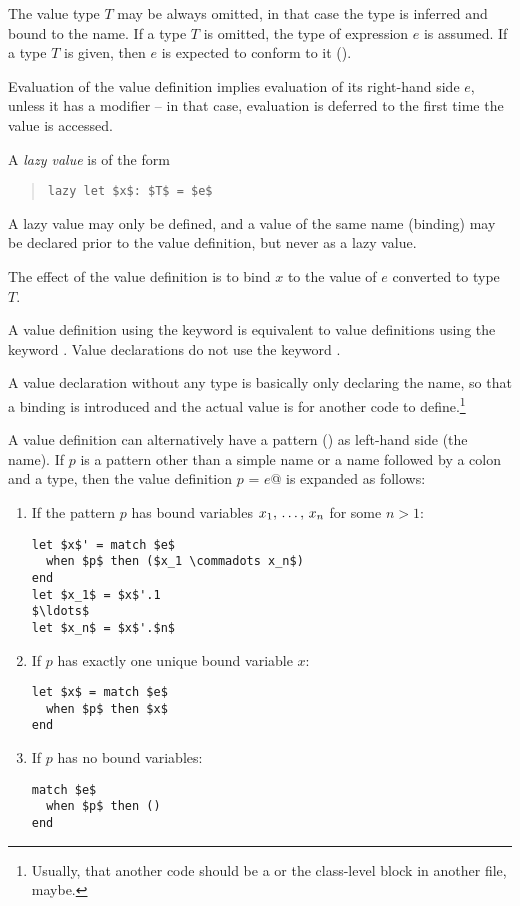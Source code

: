 The value type $T$ may be always omitted, in that case the type is inferred and bound to the name. If a type $T$ is omitted, the type of expression $e$ is assumed. If a type $T$ is given, then $e$ is expected to conform to it (). 

Evaluation of the value definition implies evaluation of its right-hand side $e$, unless it has a modifier  -- in that case, evaluation is deferred to the first time the value is accessed. 

A {\em lazy value} is of the form
\begin{quote}\begin{lstlisting}
lazy let $x$: $T$ = $e$
\end{lstlisting}\end{quote}

A lazy value may only be defined, and a value of the same name (binding) may be declared prior to the value definition, but never as a lazy value. 

The effect of the value definition is to bind $x$ to the value of $e$ converted to type $T$. 

A value definition using the keyword  is equivalent to value definitions using the keyword . Value declarations do not use the keyword . 

A value declaration without any type is basically only declaring the name, so that a binding is introduced and the actual value is for another code to define.\footnote{Usually, that another code should be a  or the class-level block in another file, maybe.}

A value definition can alternatively have a pattern () as left-hand side (the name). If $p$ is a pattern other than a simple name or a name followed by a colon and a type, then the value definition \lstinline@val $p$ = $e$@ is expanded as follows: 

\begin{enumerate}
\item
If the pattern $p$ has bound variables $x_1 ,\, \ldots ,\, x_n$ for some $n > 1$:
\begin{lstlisting}[escapechar=@]
let $x$' = match $e$
  when $p$ then ($x_1 \commadots x_n$)
end
let $x_1$ = $x$'.1
$\ldots$
let $x_n$ = $x$'.$n$
\end{lstlisting}

\item
If $p$ has exactly one unique bound variable $x$:
\begin{lstlisting}
let $x$ = match $e$
  when $p$ then $x$
end
\end{lstlisting}

\item
If $p$ has no bound variables:
\begin{lstlisting}
match $e$
  when $p$ then ()
end
\end{lstlisting}
\end{enumerate}

